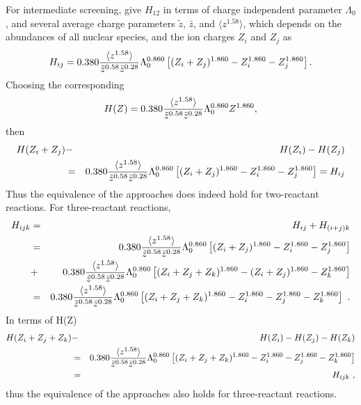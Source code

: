 \documentclass[12pt,modern,tighten,times,apj]{aastex61}
\begin{document}
For intermediate screening,  \citet{DeGrCo73} give $H_{12}$ in terms of charge independent parameter $\Lambda_0$, and several average charge parameters $\tilde z$, $\bar z$, and $\langle z^{1.58}\rangle$, which depends on the abundances of all nuclear species, and the ion charges $Z_i$ and $Z_j$ as 
\begin{equation}
H_{ij} = 0.380 {\langle z^{1.58}\rangle \over \tilde{z}^{0.58}\bar{z}^{0.28}} \Lambda_0^{0.860} \left[(Z_i + Z_j)^{1.860} - Z_i^{1.860} - Z_j^{1.860}\right].  
\end{equation} 
Choosing the corresponding 
\begin{equation}H(Z) = 0.380 {\langle z^{1.58}\rangle \over \tilde{z}^{0.58}\bar{z}^{0.28}} \Lambda_0^{0.860} Z^{1.860}, \end{equation} then 
\begin{eqnarray}
H(Z_i+Z_j) &-& H(Z_i) - H(Z_j) \\
&=& 0.380 {\langle z^{1.58}\rangle \over \tilde{z}^{0.58}\bar{z}^{0.28}} \Lambda_0^{0.860} \left[(Z_i + Z_j)^{1.860} - Z_i^{1.860} - Z_j^{1.860}\right]= H_{ij}
\end{eqnarray} 
Thus the equivalence of the approaches does indeed hold for two-reactant reactions.  
For three-reactant reactions, 
\begin{eqnarray}
H_{ijk} &=& H_{ij} + H_{(i+j)k} \\
&=& 0.380 {\langle z^{1.58}\rangle \over \tilde{z}^{0.58}\bar{z}^{0.28}} \Lambda_0^{0.860} \left[(Z_i + Z_j)^{1.860} - Z_i^{1.860} - Z_j^{1.860}\right] \\
&+& 0.380 {\langle z^{1.58}\rangle \over \tilde{z}^{0.58}\bar{z}^{0.28}} \Lambda_0^{0.860} \left[(Z_i + Z_j+Z_k)^{1.860} - (Z_i + Z_j)^{1.860} - Z_k^{1.860}\right] \\
&=&  0.380 {\langle z^{1.58}\rangle \over \tilde{z}^{0.58}\bar{z}^{0.28}} \Lambda_0^{0.860} \left[(Z_i + Z_j+Z_k)^{1.860} - Z_i^{1.860} - Z_j^{1.860} - Z_k^{1.860} \right]
\ .
\end{eqnarray}
In terms of H(Z)
\begin{eqnarray}
H(Z_i+Z_j+Z_k) &-& H(Z_i) - H(Z_j) - H(Z_k) \\
&=&  0.380 {\langle z^{1.58}\rangle \over \tilde{z}^{0.58}\bar{z}^{0.28}} \Lambda_0^{0.860} \left[(Z_i + Z_j+Z_k)^{1.860} - Z_i^{1.860} - Z_j^{1.860} - Z_k^{1.860} \right]\\
&=&  H_{ijk} \ ,  
\end{eqnarray}
thus the equivalence of the approaches also holds for three-reactant reactions.
\end{document}
